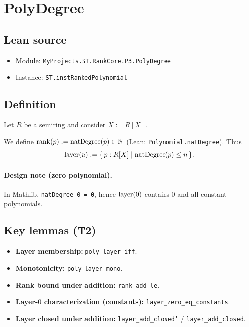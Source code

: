 \section{PolyDegree}
\label{sec:ex-polydegree}

\subsection{Lean source}
\begin{itemize}
\item Module: \texttt{MyProjects.ST.RankCore.P3.PolyDegree}
\item Instance: \texttt{ST.instRankedPolynomial}
\end{itemize}

\subsection{Definition}
Let $R$ be a semiring and consider $X := R[X]$.
\begin{definition}
We define $\operatorname{rank}(p) := \mathrm{natDegree}(p) \in \mathbb{N}$ (Lean: \texttt{Polynomial.natDegree}).
Thus
\[
  \operatorname{layer}(n) := \{\, p : R[X] \mid \mathrm{natDegree}(p) \le n \,\}.
\]
\end{definition}

\paragraph{Design note (zero polynomial).}
In Mathlib, \texttt{natDegree 0 = 0}, hence $\operatorname{layer}(0)$ contains $0$ and all constant polynomials.

\subsection{Key lemmas (T2)}
\begin{itemize}
\item \textbf{Layer membership:} \texttt{poly\_layer\_iff}.
\item \textbf{Monotonicity:} \texttt{poly\_layer\_mono}.
\item \textbf{Rank bound under addition:} \texttt{rank\_add\_le}.
\item \textbf{Layer-$0$ characterization (constants):} \texttt{layer\_zero\_eq\_constants}.
\item \textbf{Layer closed under addition:} \texttt{layer\_add\_closed'} / \texttt{layer\_add\_closed}.
\end{itemize}


